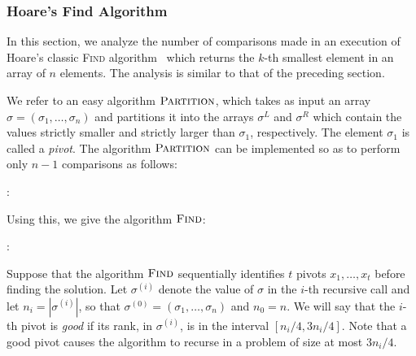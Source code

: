 \documentclass[format=acmsmall, review=false, screen=true]{acmart}
\begin{document}
\subsubsection{Hoare's Find Algorithm}

In this section, we analyze the number of comparisons made in an
execution of Hoare's classic \textsc{Find} algorithm~\cite{hoare:find}
which returns the $k$-th smallest element in an array of $n$
elements. The analysis is similar to that of the preceding section.

We refer to an easy algorithm $\textsc{Partition}$, which takes as
input an array $\sigma = (\sigma_1, \dots, \sigma_n)$ and partitions
it into the arrays $\sigma^L$ and $\sigma^R$ which contain the values
strictly smaller and strictly larger than $\sigma_1$,
respectively. The element $\sigma_1$ is called a \emph{pivot}. The
algorithm $\textsc{Partition}$ can be implemented so as to perform
only $n - 1$ comparisons as follows:

:
\begin{algorithmic}[1]
    \ELSE
    \ENDIF
  \ENDFOR
\end{algorithmic}

Using this, we give the algorithm $\textsc{Find}$:

:
\begin{algorithmic}[1]
  \ENDIF
\end{algorithmic}

Suppose that the algorithm $\textsc{Find}$ sequentially identifies $t$
pivots $x_1, \dots, x_t$ before finding the solution. Let
$\sigma^{(i)}$ denote the value of $\sigma$ in the $i$-th recursive
call and let $n_i=|\sigma^{(i)}|$, so that
$\sigma^{(0)}=(\sigma_1,\ldots,\sigma_n)$ and $n_0=n$.  We will say
that the $i$-th pivot is \emph{good} if its rank, in $\sigma^{(i)}$,
is in the interval $[n_i/4, 3n_i/4]$. Note that a good pivot causes
the algorithm to recurse in a problem of size at most $3n_i/4$.
\end{document}
